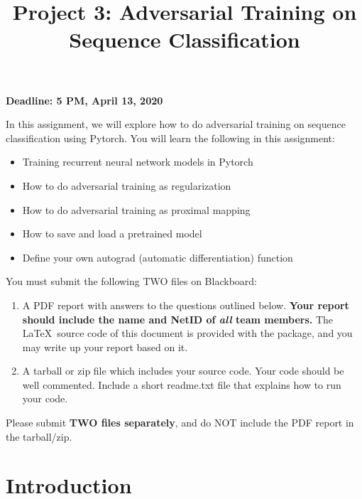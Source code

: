 \documentclass[11pt]{report}
\title{Project 3: Adversarial Training on Sequence Classification}
\begin{document}
\maketitle

{\bf Deadline: 5 PM, April 13, 2020}

In this assignment, we will explore how to do adversarial training on sequence classification using Pytorch. You will learn the following in this assignment:

\vspace{-0.9em}
\begin{itemize}
\item Training recurrent neural network models in Pytorch

\item How to do adversarial training as regularization

\item How to do adversarial training as proximal mapping

\item How to save and load a pretrained model

\item Define your own autograd (automatic differentiation) function
\end{itemize}
\vspace{-0.8em}

You must submit the following TWO files on Blackboard:
\vspace{-1em}
\begin{enumerate}

  \item  A PDF report with answers to the questions outlined below.
    {\bf Your report should include the name and NetID of \emph{all} team members.}
    The \LaTeX\ source code of this document is provided with the package, and
    you may write up your report based on it.
  \item A tarball or zip file which includes your source code. Your code should
    be well commented.
    Include a short readme.txt file that explains how to run your code.
\end{enumerate}
\vspace{-1em}

Please submit {\bf TWO files separately}, and do NOT include the PDF report in
the tarball/zip.


\section{Introduction}
\label{sec:Introduction}
\end{document}

